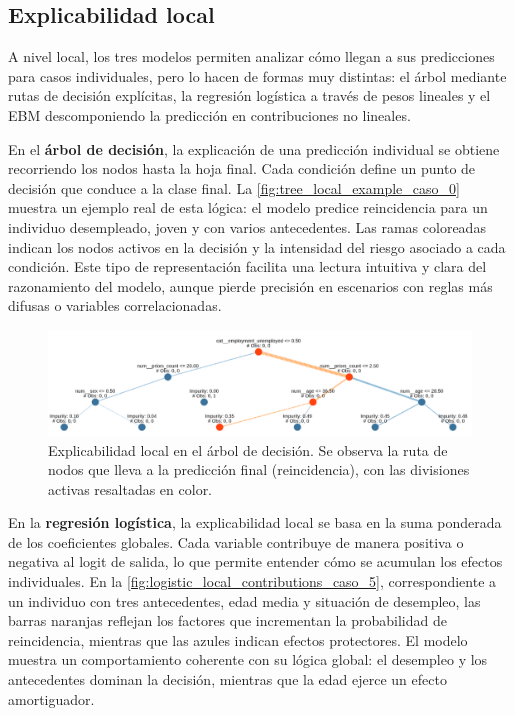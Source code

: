 \subsection{Explicabilidad local}

A nivel local, los tres modelos permiten analizar cómo llegan a sus predicciones para casos individuales, pero lo hacen de formas muy distintas: el árbol mediante rutas de decisión explícitas, la regresión logística a través de pesos lineales y el EBM descomponiendo la predicción en contribuciones no lineales.

En el \textbf{árbol de decisión}, la explicación de una predicción individual se obtiene recorriendo los nodos hasta la hoja final. 
Cada condición define un punto de decisión que conduce a la clase final. 
La \autoref{fig:tree_local_example_caso_0} muestra un ejemplo real de esta lógica: el modelo predice reincidencia para un individuo desempleado, joven y con varios antecedentes. 
Las ramas coloreadas indican los nodos activos en la decisión y la intensidad del riesgo asociado a cada condición. 
Este tipo de representación facilita una lectura intuitiva y clara del razonamiento del modelo, aunque pierde precisión en escenarios con reglas más difusas o variables correlacionadas.

\begin{figure}[h]
  \centering
  \includegraphics[width=0.9\linewidth]{figures/tree_local_example_caso_0.png}
  \caption{Explicabilidad local en el árbol de decisión. 
  Se observa la ruta de nodos que lleva a la predicción final (reincidencia), con las divisiones activas resaltadas en color.}
  \label{fig:tree_local_example_caso_0}
\end{figure}

En la \textbf{regresión logística}, la explicabilidad local se basa en la suma ponderada de los coeficientes globales. 
Cada variable contribuye de manera positiva o negativa al logit de salida, lo que permite entender cómo se acumulan los efectos individuales. 
En la \autoref{fig:logistic_local_contributions_caso_5}, correspondiente a un individuo con tres antecedentes, edad media y situación de desempleo, las barras naranjas reflejan los factores que incrementan la probabilidad de reincidencia, mientras que las azules indican efectos protectores. 
El modelo muestra un comportamiento coherente con su lógica global: el desempleo y los antecedentes dominan la decisión, mientras que la edad ejerce un efecto amortiguador. 

